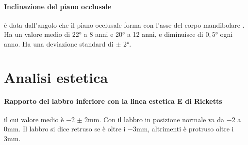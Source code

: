 \paragraph{Inclinazione del piano occlusale} è data dall'angolo che il piano occlusale forma con l'asse del corpo mandibolare . Ha un valore medio di 22° a 8 anni e 20° a 12 anni, e diminuisce di $0,5$° ogni anno. Ha una deviazione standard di $\pm$ 2°.

\section{Analisi estetica}

\paragraph{Rapporto del labbro inferiore con la linea estetica E di Ricketts} il cui valore medio è $-$2 $\pm$ 2mm. Con il labbro in posizione normale va da $-$2 a 0mm. Il labbro si dice retruso se è oltre i $-$3mm, altrimenti è protruso oltre i 3mm.
